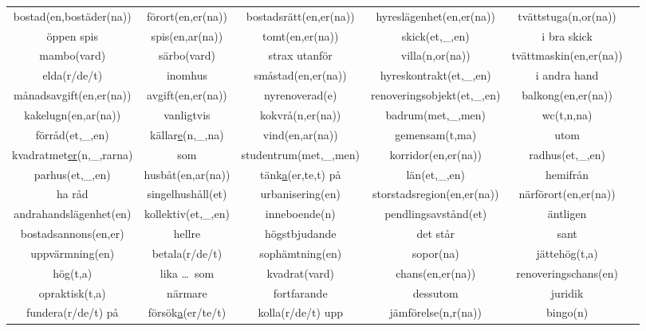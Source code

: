 
\begin{center}
    \begin{adjustwidth}{-2.5cm}{}
        \begin{tabular}{|c c c c c c|}
            \hline
            bostad(en,bostäder(na)) & förort(en,er(na)) & bostadsrätt(en,er(na)) & hyreslägenhet(en,er(na)) & tvättstuga(n,or(na)) &  \\
            öppen spis & spis(en,ar(na)) & tomt(en,er(na)) & skick(et,\_,en) & i bra skick &  \\
            mambo(vard) & särbo(vard) & strax utanför & villa(n,or(na)) & tvättmaskin(en,er(na)) &  \\
            elda(r/de/t) & inomhus & småstad(en,er(na)) & hyreskontrakt(et,\_,en) & i andra hand &  \\
            månadsavgift(en,er(na)) & avgift(en,er(na)) & nyrenoverad(e) & renoveringsobjekt(et,\_,en) & balkong(en,er(na)) &  \\
            kakelugn(en,ar(na)) & vanligtvis & kokvrå(n,er(na)) & badrum(met,\_,men) & wc(t,n,na) &  \\
            förråd(et,\_,en) & källar\underline{e}(n,\_,na) & vind(en,ar(na)) & gemensam(t,ma) & utom &  \\
            kvadratmet\underline{er}(n,\_,rarna) & som & studentrum(met,\_,men) & korridor(en,er(na)) & radhus(et,\_,en) &  \\
            parhus(et,\_,en) & husbåt(en,ar(na)) & tänk\underline{a}(er,te,t) på & län(et,\_,en) & hemifrån &  \\
            ha råd & singelhushåll(et) & urbanisering(en) & storstadsregion(en,er(na)) & närförort(en,er(na)) &  \\
            andrahandslägenhet(en) & kollektiv(et,\_,en) & inneboende(n) & pendlingsavstånd(et) & äntligen &  \\
            bostadsannons(en,er) & hellre & högstbjudande & det står & sant &  \\
            uppvärmning(en) & betala(r/de/t) & sophämtning(en) & sopor(na) & jättehög(t,a) &  \\
            hög(t,a) & lika \ldots\ som & kvadrat(vard) & chans(en,er(na)) & renoveringschans(en) &  \\
            opraktisk(t,a) & närmare & fortfarande & dessutom & juridik &  \\
            fundera(r/de/t) på & försök\underline{a}(er/te/t) & kolla(r/de/t) upp & jämförelse(n,r(na)) & bingo(n) &  \\

\end{tabular}
\end{adjustwidth}
\end{center}
